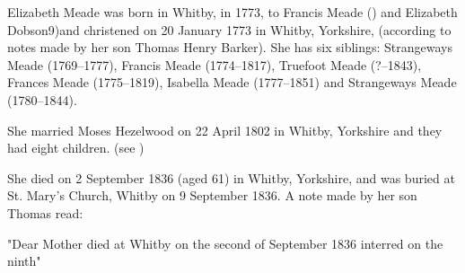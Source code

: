 
Elizabeth Meade was born in Whitby, in 1773, to Francis Meade () and Elizabeth Dobson9)and christened on	20 January 1773 in	Whitby, Yorkshire, (according to notes made by her son Thomas Henry Barker). She has six siblings: Strangeways Meade (1769--1777), Francis Meade (1774--1817), Truefoot Meade (?--1843),
Frances Meade (1775--1819), Isabella Meade (1777--1851) and Strangeways Meade (1780--1844).

She married Moses Hezelwood on 22 April 1802 in	Whitby, Yorkshire \cite{MHezelwoodMarriage} and they had eight children. (see )

She died on	2 September 1836 (aged 61) in	Whitby, Yorkshire, and was buried at St. Mary's Church, Whitby on 9 September 1836. \cite{EMeadeDeath} A note made by her son Thomas read: 

 "Dear Mother died at Whitby on the second of September 1836 interred on the ninth"

